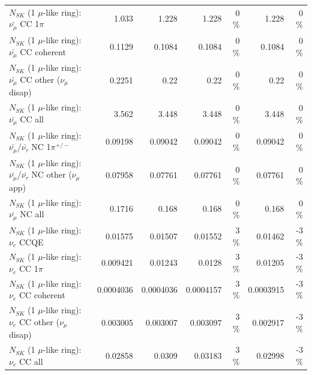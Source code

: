 \begin{table}
\begin{tabular}{| l | r | r | r  r | r  r |}
                         $N_{SK}$ (1 $\mu$-like ring): $\bar{\nu_\mu}$ CC 1$\pi$ &           1.033 &           1.228 &           1.228 &        0 \%  &           1.228 &        0 \%  \\ 
                       $N_{SK}$ (1 $\mu$-like ring): $\bar{\nu_\mu}$ CC coherent &          0.1129 &          0.1084 &          0.1084 &        0 \%  &          0.1084 &        0 \%  \\ 
        $N_{SK}$ (1 $\mu$-like ring): $\bar{\nu_\mu}$ CC other ($\nu_\mu$ disap) &          0.2251 &            0.22 &            0.22 &        0 \%  &            0.22 &        0 \%  \\ 
                          $N_{SK}$ (1 $\mu$-like ring): $\bar{\nu_{\mu}}$ CC all &           3.562 &           3.448 &           3.448 &        0 \%  &           3.448 &        0 \%  \\ 
\hline
  $N_{SK}$ (1 $\mu$-like ring): $\bar{\nu_\mu}$/$\bar{\nu_\tau}$ NC 1$\pi^{+/-}$ &         0.09198 &         0.09042 &         0.09042 &        0 \%  &         0.09042 &        0 \%  \\ 
$N_{SK}$ (1 $\mu$-like ring): $\bar{\nu_\mu}$/$\bar{\nu_\tau}$ NC other ($\nu_\mu$ app) &         0.07958 &         0.07761 &         0.07761 &        0 \%  &         0.07761 &        0 \%  \\ 
                          $N_{SK}$ (1 $\mu$-like ring): $\bar{\nu_{\mu}}$ NC all &          0.1716 &           0.168 &           0.168 &        0 \%  &           0.168 &        0 \%  \\ 
\hline
\hline
\hline
                                      $N_{SK}$ (1 $\mu$-like ring): $\nu_e$ CCQE &         0.01575 &         0.01507 &         0.01552 &        3 \%  &         0.01462 &       -3 \%  \\ 
                                 $N_{SK}$ (1 $\mu$-like ring): $\nu_e$ CC 1$\pi$ &        0.009421 &         0.01243 &          0.0128 &        3 \%  &         0.01205 &       -3 \%  \\ 
                               $N_{SK}$ (1 $\mu$-like ring): $\nu_e$ CC coherent &       0.0004036 &       0.0004036 &       0.0004157 &        3 \%  &       0.0003915 &       -3 \%  \\ 
                $N_{SK}$ (1 $\mu$-like ring): $\nu_e$ CC other ($\nu_\mu$ disap) &        0.003005 &        0.003007 &        0.003097 &        3 \%  &        0.002917 &       -3 \%  \\ 
                                  $N_{SK}$ (1 $\mu$-like ring): $\nu_{e}$ CC all &         0.02858 &          0.0309 &         0.03183 &        3 \%  &         0.02998 &       -3 \%  \\ 

\end{tabular}
\end{table}
